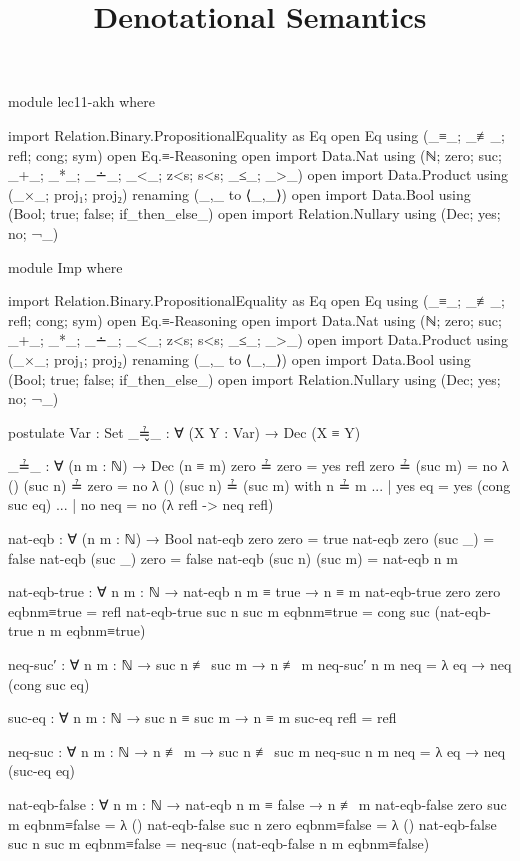 \documentclass{lecturenotes}
\title{Denotational Semantics}
\begin{document}
\maketitle

\begin{code}[hide]
module lec11-akh where

import Relation.Binary.PropositionalEquality as Eq
open Eq using (_≡_; _≢_; refl; cong; sym)
open Eq.≡-Reasoning
open import Data.Nat using (ℕ; zero; suc; _+_; _*_; _∸_; _<_; z<s; s<s; _≤_; _>_)
open import Data.Product using (_×_; proj₁; proj₂) renaming (_,_ to ⟨_,_⟩)
open import Data.Bool using (Bool; true; false; if_then_else_)
open import Relation.Nullary using (Dec; yes; no; ¬_)

module Imp where

import Relation.Binary.PropositionalEquality as Eq
open Eq using (_≡_; _≢_; refl; cong; sym)
open Eq.≡-Reasoning
open import Data.Nat using (ℕ; zero; suc; _+_; _*_; _∸_; _<_; z<s; s<s; _≤_; _>_)
open import Data.Product using (_×_; proj₁; proj₂) renaming (_,_ to ⟨_,_⟩)
open import Data.Bool using (Bool; true; false; if_then_else_)
open import Relation.Nullary using (Dec; yes; no; ¬_)

postulate
  Var : Set
  _≟̬_ : ∀ (X Y : Var) → Dec (X ≡ Y)

_≟_ : ∀ (n m : ℕ) → Dec (n ≡ m)
zero ≟ zero = yes refl
zero ≟ (suc m) = no λ ()
(suc n) ≟ zero = no λ ()
(suc n) ≟ (suc m) with n ≟ m
... | yes eq  = yes (cong suc eq)
... | no neq = no (λ {refl -> neq refl}) 

nat-eqb : ∀ (n m : ℕ) → Bool
nat-eqb zero zero = true
nat-eqb zero (suc _) = false
nat-eqb (suc _) zero = false
nat-eqb (suc n) (suc m) = nat-eqb n m

nat-eqb-true : ∀ {n m : ℕ} → nat-eqb n m ≡ true → n ≡ m
nat-eqb-true {zero} {zero} eqbnm≡true = refl
nat-eqb-true {suc n} {suc m} eqbnm≡true  = cong suc (nat-eqb-true {n} {m} eqbnm≡true)

neq-suc′ : ∀ {n m : ℕ} → suc n ≢ suc m → n ≢ m
neq-suc′ {n} {m} neq = λ eq → neq (cong suc eq)

suc-eq : ∀ {n m : ℕ} → suc n ≡ suc m → n ≡ m
suc-eq refl = refl

neq-suc : ∀ {n m : ℕ} → n ≢ m → suc n ≢ suc m
neq-suc {n} {m} neq = λ {eq → neq (suc-eq eq)} 

nat-eqb-false : ∀ {n m : ℕ} → nat-eqb n m ≡ false → n ≢ m
nat-eqb-false {zero} {suc m} eqbnm≡false = λ ()
nat-eqb-false {suc n} {zero} eqbnm≡false = λ () 
nat-eqb-false {suc n} {suc m} eqbnm≡false = neq-suc (nat-eqb-false {n} {m} eqbnm≡false)


\end{code}
\end{document}
